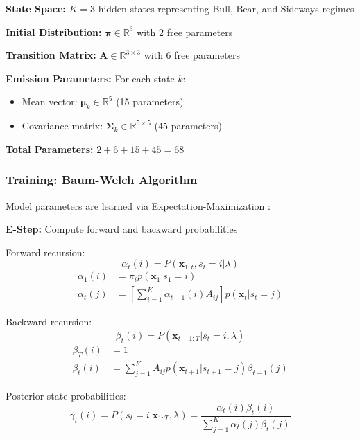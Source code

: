 \documentclass[conference]{IEEEtran}
\begin{document}
\textbf{State Space:} $K = 3$ hidden states representing Bull, Bear, and Sideways regimes

\textbf{Initial Distribution:} $\boldsymbol{\pi} \in \mathbb{R}^3$ with 2 free parameters

\textbf{Transition Matrix:} $\mathbf{A} \in \mathbb{R}^{3 \times 3}$ with 6 free parameters

\textbf{Emission Parameters:} For each state $k$:
\begin{itemize}
\item Mean vector: $\boldsymbol{\mu}_k \in \mathbb{R}^5$ (15 parameters)
\item Covariance matrix: $\boldsymbol{\Sigma}_k \in \mathbb{R}^{5 \times 5}$ (45 parameters)
\end{itemize}

\textbf{Total Parameters:} $2 + 6 + 15 + 45 = 68$

\subsubsection{Training: Baum-Welch Algorithm}
Model parameters are learned via Expectation-Maximization \cite{baum1966}:

\textbf{E-Step:} Compute forward and backward probabilities

Forward recursion:
\begin{equation}
\alpha_t(i) = P(\mathbf{x}_{1:t}, s_t=i | \lambda)
\end{equation}
\begin{align}
\alpha_1(i) &= \pi_i p(\mathbf{x}_1 | s_1=i) \\
\alpha_t(j) &= \left[\sum_{i=1}^{K}\alpha_{t-1}(i)A_{ij}\right] p(\mathbf{x}_t | s_t=j)
\end{align}

Backward recursion:
\begin{equation}
\beta_t(i) = P(\mathbf{x}_{t+1:T} | s_t=i, \lambda)
\end{equation}
\begin{align}
\beta_T(i) &= 1 \\
\beta_t(i) &= \sum_{j=1}^{K}A_{ij}p(\mathbf{x}_{t+1} | s_{t+1}=j)\beta_{t+1}(j)
\end{align}

Posterior state probabilities:
\begin{equation}
\gamma_t(i) = P(s_t=i | \mathbf{x}_{1:T}, \lambda) = \frac{\alpha_t(i)\beta_t(i)}{\sum_{j=1}^{K}\alpha_t(j)\beta_t(j)}
\end{equation}
\end{document}
